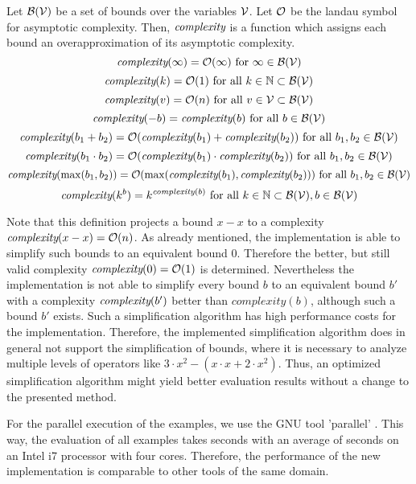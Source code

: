 \begin{definition}
  Let $\mathcal{B}(\mathcal{V})$ be a set of bounds over the variables $\mathcal{V}$.
  Let $\mathcal{O}$ be the landau symbol for asymptotic complexity.
  Then, $\emph{complexity}$ is a function which assigns each bound an overapproximation of its asymptotic complexity.
  \[ \emph{complexity}(\infty) = \mathcal{O}(\infty) \text{ for } \infty \in \mathcal{B}(\mathcal{V}) \]
  \[ \emph{complexity}(k) = \mathcal{O}(1) \text{ for all } k \in \mathbb{N} \subset \mathcal{B}(\mathcal{V}) \] 
  \[ \emph{complexity}(v) = \mathcal{O}(n) \text{ for all } v \in \mathcal{V} \subset \mathcal{B}(\mathcal{V}) \] 
  \[ \emph{complexity}(-b) = \emph{complexity}(b) \text{ for all } b \in \mathcal{B}(\mathcal{V}) \] 
  \[ \emph{complexity}(b_1 + b_2) = \mathcal{O}(\emph{complexity}(b_1) + \emph{complexity}(b_2)) \text{ for all } b_1, b_2 \in \mathcal{B}(\mathcal{V}) \] 
  \[ \emph{complexity}(b_1 \cdot b_2) = \mathcal{O}(\emph{complexity}(b_1) \cdot \emph{complexity}(b_2)) \text{ for all } b_1, b_2 \in \mathcal{B}(\mathcal{V}) \] 
  \[ \emph{complexity}(\max(b_1, b_2)) = \mathcal{O}(\max(\emph{complexity}(b_1), \emph{complexity}(b_2))) \text{ for all } b_1, b_2 \in \mathcal{B}(\mathcal{V}) \]
  \[ \emph{complexity}(k^b) = k^{\emph{complexity}(b)} \text{ for all } k \in \mathbb{N} \subset \mathcal{B}(\mathcal{V}), b \in \mathcal{B}(\mathcal{V}) \]  
\end{definition}

Note that this definition projects a bound $x-x$ to a complexity $\emph{complexity}(x-x) = \mathcal{O}(n)$.
As already mentioned, the implementation is able to simplify such bounds to an equivalent bound $0$.
Therefore the better, but still valid complexity $\emph{complexity}(0) = \mathcal{O}(1)$ is determined.
Nevertheless the implementation is not able to simplify every bound $b$ to an equivalent bound $b'$ with a complexity $\emph{complexity}(b')$ better than $complexity(b)$, although such a bound $b'$ exists.
Such a simplification algorithm has high performance costs for the implementation.
Therefore, the implemented simplification algorithm does in general not support the simplification of bounds, where it is necessary to analyze multiple levels of operators like $3 \cdot x^2-(x \cdot x+2 \cdot x^2)$.
Thus, an optimized simplification algorithm might yield better evaluation results without a change to the presented method.

For the parallel execution of the examples, we use the GNU tool 'parallel' \cite{gnuparallel}.
This way, the evaluation of all examples takes  seconds with an average of  seconds on an Intel i7 processor with four cores.
Therefore, the performance of the new implementation is comparable to other tools of the same domain.

